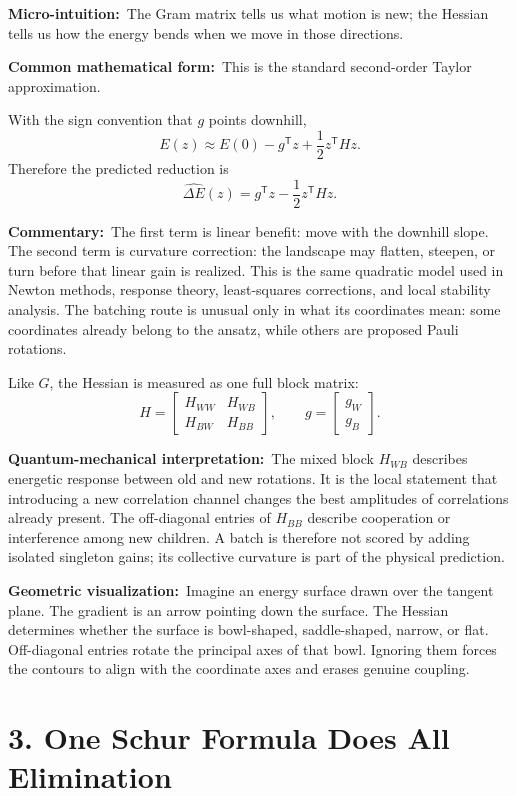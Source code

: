 \documentclass[10pt,twocolumn]{article}
\newcommand{\micro}[1]{\par\noindent\textbf{Micro-intuition:}\ #1\par}
\newcommand{\form}[1]{\par\noindent\textbf{Common mathematical form:}\ #1\par}
\newcommand{\commentary}[1]{\par\noindent\textbf{Commentary:}\ #1\par}
\newcommand{\phys}[1]{\par\noindent\textbf{Quantum-mechanical interpretation:}\ #1\par}
\newcommand{\geom}[1]{\par\noindent\textbf{Geometric visualization:}\ \textcolor{teal!70!black}{#1}\par}
\begin{document}
\micro{The Gram matrix tells us what motion is new; the Hessian tells us how
the energy bends when we move in those directions.}

\form{This is the standard second-order Taylor approximation.}

With the sign convention that \(g\) points downhill,
\[
E(z)\approx E(0)-g^{\mathsf T}z+\frac12z^{\mathsf T}Hz.
\]
Therefore the predicted reduction is
\[
\boxed{
\widehat{\Delta E}(z)
=g^{\mathsf T}z-\frac12z^{\mathsf T}Hz.
}
\]

\commentary{The first term is linear benefit: move with the downhill slope.
The second term is curvature correction: the landscape may flatten, steepen,
or turn before that linear gain is realized. This is the same quadratic model
used in Newton methods, response theory, least-squares corrections, and local
stability analysis. The batching route is unusual only in what its coordinates
mean: some coordinates already belong to the ansatz, while others are proposed
Pauli rotations.}

Like \(G\), the Hessian is measured as one full block matrix:
\[
H=
\begin{bmatrix}
H_{WW}&H_{WB}\\
H_{BW}&H_{BB}
\end{bmatrix},
\qquad
g=
\begin{bmatrix}
g_W\\g_B
\end{bmatrix}.
\]

\phys{The mixed block \(H_{WB}\) describes energetic response between old and
new rotations. It is the local statement that introducing a new correlation
channel changes the best amplitudes of correlations already present. The
off-diagonal entries of \(H_{BB}\) describe cooperation or interference among
new children. A batch is therefore not scored by adding isolated singleton
gains; its collective curvature is part of the physical prediction.}

\geom{Imagine an energy surface drawn over the tangent plane. The gradient is
an arrow pointing down the surface. The Hessian determines whether the surface
is bowl-shaped, saddle-shaped, narrow, or flat. Off-diagonal entries rotate the
principal axes of that bowl. Ignoring them forces the contours to align with
the coordinate axes and erases genuine coupling.}

\section*{3. One Schur Formula Does All Elimination}
\end{document}
